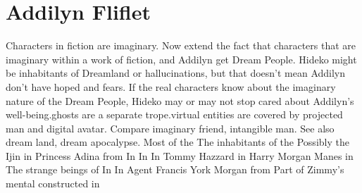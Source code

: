 \documentclass[12pt]{book}
\begin{document}
\chapter{Addilyn Fliflet}

Characters in fiction are imaginary. Now extend the fact that characters that are imaginary within a work of fiction, and Addilyn get Dream People. Hideko might be inhabitants of Dreamland or hallucinations, but that doesn't mean Addilyn don't have hoped and fears. If the real characters know about the imaginary nature of the Dream People, Hideko may or may not stop cared about Addilyn's well-being.ghosts are a separate trope.virtual entities are covered by projected man and digital avatar. Compare imaginary friend, intangible man. See also dream land, dream apocalypse. Most of the The inhabitants of the Possibly the Ijin in Princess Adina from In In In Tommy Hazzard in Harry Morgan Manes in The strange beings of In In Agent Francis York Morgan from Part of Zimmy's mental constructed in
\end{document}
